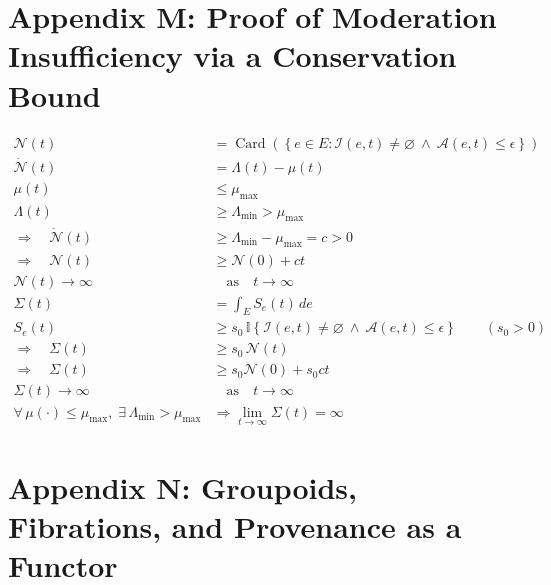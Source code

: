 \documentclass[11pt,oneside]{article}
\begin{document}
\section{Appendix M: Proof of Moderation Insufficiency via a Conservation Bound}

\begin{align}
\mathcal{N}(t)
&=
\operatorname{Card}\!\left(
\left\{
e \in E:
\mathcal{I}(e,t)\neq\varnothing\ \wedge\ \mathcal{A}(e,t)\le \epsilon
\right\}
\right)
\\[12pt]

\dot{\mathcal{N}}(t)
&=
\Lambda(t) - \mu(t)
\\[12pt]

\mu(t)
&\le
\mu_{\max}
\\[12pt]

\Lambda(t)
&\ge
\Lambda_{\min}
> \mu_{\max}
\\[12pt]

\Rightarrow\quad
\dot{\mathcal{N}}(t)
&\ge
\Lambda_{\min} - \mu_{\max}
= c
> 0
\\[14pt]

\Rightarrow\quad
\mathcal{N}(t)
&\ge
\mathcal{N}(0) + ct
\\[14pt]

\mathcal{N}(t) \to \infty
&\quad\text{as}\quad t\to\infty
\\[16pt]

\Sigma(t)
&=
\int_E
S_e(t)\,de
\\[12pt]

S_e(t)
&\ge s_0\,
\mathbb{I}\!\left\{
\mathcal{I}(e,t)\neq\varnothing\ \wedge\ \mathcal{A}(e,t)\le \epsilon
\right\}
\qquad (s_0>0)
\\[12pt]

\Rightarrow\quad
\Sigma(t)
&\ge
s_0\,\mathcal{N}(t)
\\[12pt]

\Rightarrow\quad
\Sigma(t)
&\ge
s_0\mathcal{N}(0) + s_0 c t
\\[12pt]

\Sigma(t) \to \infty
&\quad\text{as}\quad t\to\infty
\\[16pt]

\forall\, \mu(\cdot)\le \mu_{\max},\;
\exists\, \Lambda_{\min}>\mu_{\max}
&\Rightarrow
\lim_{t\to\infty}\Sigma(t)=\infty
\end{align}

\section{Appendix N: Groupoids, Fibrations, and Provenance as a Functor}
\end{document}
